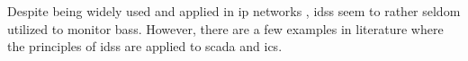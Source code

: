 Despite being widely used and applied in \gls{ip} networks \parencite[cf.][pp.~201~ff.]{Northcutt2005}, \glspl{ids} seem to rather seldom utilized to monitor \glspl{bas}.
However, there are a few examples in literature where the principles of \glspl{ids} are applied to \gls{scada} and \gls{ics}.

